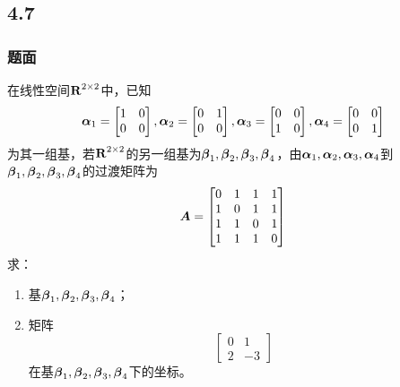 \documentclass{beamer}
\begin{document}
\subsection*{4.7}
\begin{frame}[allowframebreaks]
    \frametitle{题面}
    在线性空间\(\boldsymbol{\mathrm{R}}^{2\times2}\)中，已知
    \begin{equation*}
        \boldsymbol{\alpha}_1=\begin{bmatrix}1&0\\0&0\end{bmatrix},
        \boldsymbol{\alpha}_2=\begin{bmatrix}0&1\\0&0\end{bmatrix},
        \boldsymbol{\alpha}_3=\begin{bmatrix}0&0\\1&0\end{bmatrix},
        \boldsymbol{\alpha}_4=\begin{bmatrix}0&0\\0&1\end{bmatrix}
    \end{equation*}
    为其一组基，若\(\boldsymbol{\mathrm{R}}^{2\times2}\)的另一组基为\(\boldsymbol{\beta}_1,\boldsymbol{\beta}_2,\boldsymbol{\beta}_3,\boldsymbol{\beta}_4\)，由\(\boldsymbol{\alpha}_1,\boldsymbol{\alpha}_2,\boldsymbol{\alpha}_3,\boldsymbol{\alpha}_4\)到\(\boldsymbol{\beta}_1,\boldsymbol{\beta}_2,\boldsymbol{\beta}_3,\boldsymbol{\beta}_4\)的过渡矩阵为
    \begin{equation*}
        \boldsymbol{A}=
        \begin{bmatrix}
            0 & 1 & 1 & 1 \\
            1 & 0 & 1 & 1 \\
            1 & 1 & 0 & 1 \\
            1 & 1 & 1 & 0
        \end{bmatrix}
    \end{equation*}
    求：
    \begin{enumerate}
        \item 基\(\boldsymbol{\beta}_1,\boldsymbol{\beta}_2,\boldsymbol{\beta}_3,\boldsymbol{\beta}_4\)；
        \item 矩阵\begin{equation*}\begin{bmatrix}0&1\\2&-3\end{bmatrix}\end{equation*}在基\(\boldsymbol{\beta}_1,\boldsymbol{\beta}_2,\boldsymbol{\beta}_3,\boldsymbol{\beta}_4\)下的坐标。
    \end{enumerate}
\end{frame}
\end{document}
